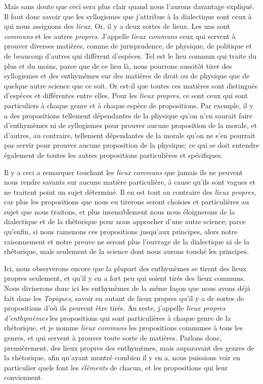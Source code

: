Mais sans doute que ceci sera plus clair quand nous l'aurons davantage expliqué. Il faut donc savoir que les syllogismes que j'attribue à la dialectique
sont ceux à qui nous assignons des \emph{lieux}. Or, il y a deux sortes de lieux. Les uns sont \emph{communs} et les autres \emph{propres}. J'appelle
\emph{lieux communs} ceux qui servent à prouver diverses matières, comme de jurisprudence, de physique, de politique et de beaucoup d'autres qui diffèrent
d'espèces. Tel est le lieu commun qui traite du plus et du moins, parce que de ce lieu là, nous pourrons aussitôt tirer des syllogismes et des enthymèmes
sur des matières de droit ou de physique que de quelque autre science que ce soit. Or est-il que toutes ces matières sont distingués d'espèces et
différentes entre elles. Pour les \emph{lieux propres}, ce sont ceux qui sont particuliers à chaque genre et à chaque espèce de propositions. Par exemple,
il y a des propositions tellement dépendantes de la physique qu'on n'en saurait faire d'enthymèmes ni de syllogismes pour prouver aucune proposition de la
morale, et d'autres, au contraire, tellement dépendantes de la morale qu'on ne s'en pourrait pas servir pour prouver aucune proposition de la physique; ce
qui se doit entendre également de toutes les autres propositions particulières et spécifiques.

\medbreak

Il y a ceci a remarquer touchant les \emph{lieux communs} que jamais ils ne peuvent nous rendre savants sur aucune matière particulière, à cause qu'ils
sont vagues et ne traitent point un sujet déterminé. Il en est tout au contraire des \emph{lieux propres}, car plus les propositions que nous eu tirerons
seront choisies et particulières au sujet que nous traitons, et plus insensiblement nous nous éloignerons de la dialectique et de la rhétorique pour nous
approcher d'une autre science; parce qu'enfin, si nous ramenons ces propositions jusqu'aux principes, alors notre raisonnement et notre preuve ne seront
plus l'ouvrage de la dialectique ni de la rhétorique, maïs seulement de la science dont nous aurons touché les principes. 

Ici, nous observerons encore que la plupart des enthymèmes se tirent des lieux propres seulement, et qu'il y en a fort peu qui soient tirés des lieux
communs. Nous diviserons donc ici les enthymèmes de la même façon que nous avons déjà fait dans les \emph{Topiques}, savoir en autant de lieux propres
qu'il y a de sortes de  propositions d'où ils peuvent être tirés. Au reste, j'appelle \emph{lieux propres d'enthymèmes} les propositions qui sont
particulières à chaque genre de la rhétorique, et je nomme \emph{lieux communs} les propositions communes à tous les genres, et qui servent à prouver
toute sorte de matières.  Parlons donc, premièrement, des lieux propres des enthymèmes, mais auparavant des genres de la rhétorique, afin qu'ayant montré
combien il y en a, nous puissions voir en particulier quels font les \emph{éléments} de chacun, et les propositions qui leur conviennent.

